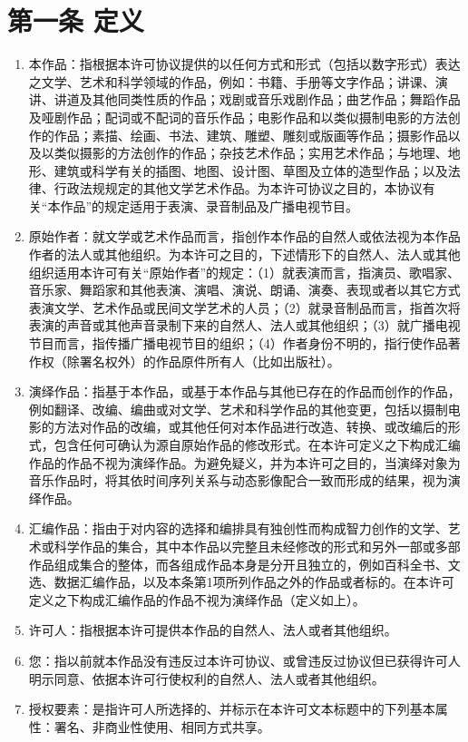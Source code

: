 \documentclass{book}
\begin{document}
\section{第一条 定义} 
\begin{enumerate}
	\item 本作品：指根据本许可协议提供的以任何方式和形式（包括以数字形式）表达之文学、艺术和科学领域的作品，例如：书籍、手册等文字作品；讲课、演讲、讲道及其他同类性质的作品；戏剧或音乐戏剧作品；曲艺作品；舞蹈作品及哑剧作品；配词或不配词的音乐作品；电影作品和以类似摄制电影的方法创作的作品；素描、绘画、书法、建筑、雕塑、雕刻或版画等作品；摄影作品以及以类似摄影的方法创作的作品；杂技艺术作品；实用艺术作品；与地理、地形、建筑或科学有关的插图、地图、设计图、草图及立体的造型作品；以及法律、行政法规规定的其他文学艺术作品。为本许可协议之目的，本协议有关“本作品”的规定适用于表演、录音制品及广播电视节目。 
	\item 原始作者：就文学或艺术作品而言，指创作本作品的自然人或依法视为本作品作者的法人或其他组织。为本许可之目的，下述情形下的自然人、法人或其他组织适用本许可有关“原始作者”的规定：（1）就表演而言，指演员、歌唱家、音乐家、舞蹈家和其他表演、演唱、演说、朗诵、演奏、表现或者以其它方式表演文学、艺术作品或民间文学艺术的人员；（2）就录音制品而言，指首次将表演的声音或其他声音录制下来的自然人、法人或其他组织；（3）就广播电视节目而言，指传播广播电视节目的组织；（4）作者身份不明的，指行使作品著作权（除署名权外）的作品原件所有人（比如出版社）。
	\item 演绎作品：指基于本作品，或基于本作品与其他已存在的作品而创作的作品，例如翻译、改编、编曲或对文学、艺术和科学作品的其他变更，包括以摄制电影的方法对作品的改编，或其他任何对本作品进行改造、转换、或改编后的形式，包含任何可确认为源自原始作品的修改形式。在本许可定义之下构成汇编作品的作品不视为演绎作品。为避免疑义，并为本许可之目的，当演绎对象为音乐作品时，将其依时间序列关系与动态影像配合一致而形成的结果，视为演绎作品。
	\item 汇编作品：指由于对内容的选择和编排具有独创性而构成智力创作的文学、艺术或科学作品的集合，其中本作品以完整且未经修改的形式和另外一部或多部作品组成集合的整体，而各组成作品本身是分开且独立的，例如百科全书、文选、数据汇编作品，以及本条第1项所列作品之外的作品或者标的。在本许可定义之下构成汇编作品的作品不视为演绎作品（定义如上）。
	\item 许可人：指根据本许可提供本作品的自然人、法人或者其他组织。
	\item 您：指以前就本作品没有违反过本许可协议、或曾违反过协议但已获得许可人明示同意、依据本许可行使权利的自然人、法人或者其他组织。
	\item 授权要素：是指许可人所选择的、并标示在本许可文本标题中的下列基本属性：署名、非商业性使用、相同方式共享。

\end{enumerate}
\end{document}
